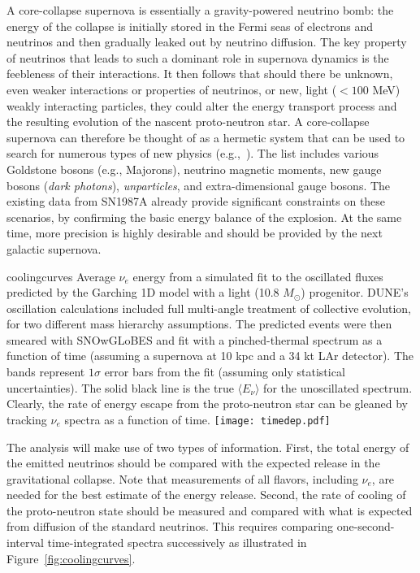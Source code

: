 A core-collapse supernova is essentially a gravity-powered neutrino bomb: the energy of the collapse is initially stored in the Fermi seas of electrons and neutrinos and then gradually leaked out by neutrino diffusion. 
The key property of neutrinos that leads to such a dominant role in supernova dynamics is the feebleness of their interactions. It then follows that should there be unknown, even weaker interactions or properties of neutrinos, or 
new, light ($< 100$ MeV) weakly interacting particles, they could alter the energy transport process and the resulting evolution of the nascent proto-neutron star. 
A core-collapse supernova can therefore be thought of as %
a hermetic system  that can be used to search for numerous types of new physics (e.g.,~\cite{Schramm:1990pf,Raffelt:1999tx}). The list includes various Goldstone bosons (e.g., Majorons), neutrino magnetic moments, new gauge bosons (\emph{dark photons}), \emph{unparticles}, and extra-dimensional gauge bosons.  The existing data from SN1987A already provide significant constraints on these scenarios, by confirming the basic energy balance of the explosion. At the same time, more precision is highly desirable and should be provided by the next galactic supernova. 

\begin{cdrfigure}{coolingcurves}{ Average $\nu_{e}$ energy from a simulated fit to the oscillated fluxes predicted by the Garching 1D model with a light (10.8 $M_{\odot}$) progenitor. DUNE's oscillation calculations included full multi-angle treatment of collective evolution, for two
different mass hierarchy assumptions. The predicted events were then smeared with SNOwGLoBES and fit with a pinched-thermal spectrum as a function of time (assuming a supernova at 10 kpc and a 34 kt LAr detector). The bands represent $1\sigma$ error bars from the fit (assuming only statistical uncertainties). The solid black line is the true
$\langle E_{\nu} \rangle$ for the unoscillated spectrum. Clearly, the rate of energy escape from the proto-neutron star can be gleaned by tracking $\nu_{e}$ spectra as a function of time.}
\texttt{[image: timedep.pdf]}
\end{cdrfigure}


The analysis  will make use of two types of information. First, the total energy of the emitted neutrinos should be  compared with the expected release in the gravitational collapse.  Note that measurements of all flavors, including $\nu_e$, are needed for the best estimate of the energy release.
Second, the rate of cooling of the proto-neutron state should be measured and compared with what is expected from diffusion of the standard neutrinos. This requires comparing one-second-interval time-integrated spectra successively %
as illustrated in Figure~\ref{fig:coolingcurves}. 

